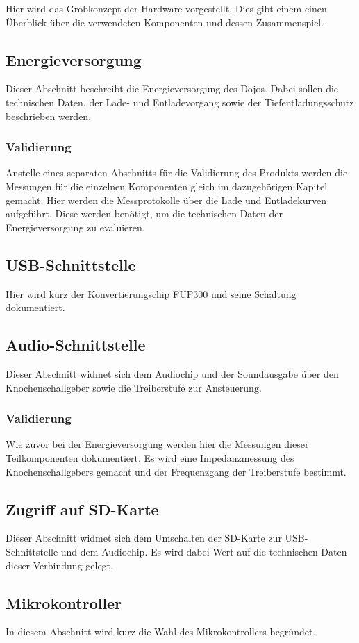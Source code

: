 Hier wird das Grobkonzept der Hardware vorgestellt. Dies gibt einem einen Überblick über die verwendeten Komponenten und dessen Zusammenspiel.

\subsection{Energieversorgung}
Dieser Abschnitt beschreibt die Energieversorgung des Dojos. Dabei sollen die technischen Daten, der Lade- und Entladevorgang sowie der Tiefentladungsschutz beschrieben werden.

\subsubsection{Validierung}
Anstelle eines separaten Abschnitts für die Validierung des Produkts werden die Messungen für die einzelnen Komponenten gleich im dazugehörigen Kapitel gemacht. Hier werden die Messprotokolle über die Lade und Entladekurven aufgeführt. Diese werden benötigt, um die technischen Daten der Energieversorgung zu evaluieren.

\subsection{USB-Schnittstelle}
Hier wird kurz der Konvertierungschip FUP300 und seine Schaltung dokumentiert.

\subsection{Audio-Schnittstelle}
Dieser Abschnitt widmet sich dem Audiochip und der Soundausgabe über den Knochenschallgeber sowie die Treiberstufe zur Ansteuerung.

\subsubsection{Validierung}
Wie zuvor bei der Energieversorgung werden hier die Messungen dieser Teilkomponenten dokumentiert. Es wird eine Impedanzmessung des Knochenschallgebers gemacht und der Frequenzgang der Treiberstufe bestimmt.

\subsection{Zugriff auf SD-Karte}
Dieser Abschnitt widmet sich dem Umschalten der SD-Karte zur USB-Schnittstelle und dem Audiochip. Es wird dabei Wert auf die technischen Daten dieser Verbindung gelegt.

\subsection{Mikrokontroller}
In diesem Abschnitt wird kurz die Wahl des Mikrokontrollers begründet.